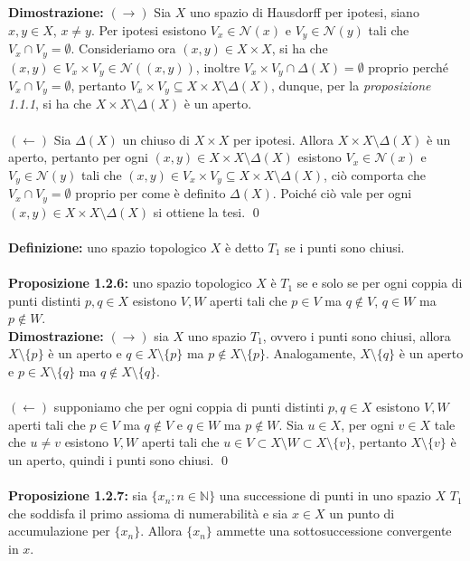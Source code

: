 \documentclass{article}
\begin{document}
\textbf{Dimostrazione:} $(\rightarrow)$ Sia $X$ uno spazio di Hausdorff per ipotesi, siano $x, y \in X$, $x \neq y$. Per ipotesi esistono $V_x \in \mathcal{N}(x)$ e $V_y \in \mathcal{N}(y)$ tali che $V_x \cap V_y = \emptyset$. Consideriamo ora $(x, y) \in X \times X$, si ha che $(x, y) \in V_x \times V_y \in \mathcal{N}((x, y))$, inoltre $V_x \times V_y \cap \Delta (X) = \emptyset$ proprio perché $V_x \cap V_y = \emptyset$, pertanto $V_x \times V_y \subseteq X \times X \setminus \Delta (X)$, dunque, per la \textit{proposizione 1.1.1}, si ha che $X \times X \setminus \Delta (X)$ è un aperto. \\ \\
$(\leftarrow)$ Sia $\Delta (X)$ un chiuso di $X \times X$ per ipotesi. Allora $X \times X \setminus \Delta (X)$ è un aperto, pertanto per ogni $(x, y) \in X \times X \setminus \Delta (X)$ esistono $V_x \in \mathcal{N}(x)$ e $V_y \in \mathcal{N}(y)$ tali che $(x, y) \in V_x \times V_y \subseteq X \times X \setminus \Delta (X)$, ciò comporta che $V_x \cap V_y = \emptyset$ proprio per come è definito $\Delta (X)$. Poiché ciò vale per ogni $(x, y) \in X \times X \setminus \Delta (X)$ si ottiene la tesi. \qed \\ \\
\textbf{Definizione:} uno spazio topologico $X$ è detto $T_1$ se i punti sono chiusi. \\ \\
\textbf{Proposizione 1.2.6:} uno spazio topologico $X$ è $T_1$ se e solo se per ogni coppia di punti distinti $p, q \in X$ esistono $V, W$ aperti tali che $p \in V$ ma $q \not\in V$, $q \in W$ ma $p \not\in W$. \\

\textbf{Dimostrazione:} $(\rightarrow)$ sia $X$ uno spazio $T_1$, ovvero i punti sono chiusi, allora $X \setminus \{ p \}$ è un aperto e $q \in X \setminus \{ p \}$ ma $p \not\in X \setminus \{ p \}$. Analogamente, $X \setminus \{ q \}$ è un aperto e $p \in X \setminus \{ q \}$ ma $q \not\in X \setminus \{ q \}$. \\ \\
$(\leftarrow)$ supponiamo che per ogni coppia di punti distinti $p, q \in X$ esistono $V, W$ aperti tali che $p \in V$ ma $q \not\in V$ e $q \in W$ ma $p \not\in W$. Sia $u \in X$, per ogni $v \in X$ tale che $u \neq v$ esistono $V, W$ aperti tali che $u \in V \subset X \setminus W \subset X \setminus \{ v \}$, pertanto $X \setminus \{ v \}$ è un aperto, quindi i punti sono chiusi. \qed \\ \\
\textbf{Proposizione 1.2.7:} sia $\{ x_n : n \in \mathbb{N} \}$ una successione di punti in uno spazio $X$ $T_1$ che soddisfa il primo assioma di numerabilità e sia $x \in X$ un punto di accumulazione per $\{ x_n \}$. Allora $\{ x_n \}$ ammette una sottosuccessione convergente in $x$. \\
\end{document}

